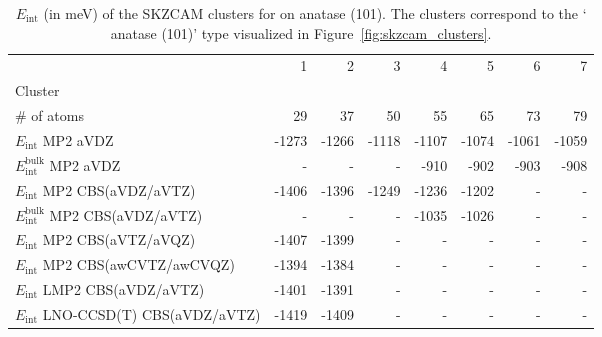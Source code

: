 \begin{table}
\caption{\label{tab:system_eint_a-tio2_h2o}$E_\textrm{int}$ (in meV) of the SKZCAM clusters for  on  anatase (101). The clusters correspond to the ` anatase (101)' type visualized in Figure~\ref{fig:skzcam_clusters}.}
\begin{adjustbox}{center,max width=1.4\textwidth}
\begin{tabular}{lrrrrrrr}
\toprule
 & 1 & 2 & 3 & 4 & 5 & 6 & 7 \\ 
Cluster &  &  &  &  &  &  &  \\
\midrule
\# of atoms & 29 & 37 & 50 & 55 & 65 & 73 & 79 \\
$E_\textrm{int}$ MP2 aVDZ & -1273 & -1266 & -1118 & -1107 & -1074 & -1061 & -1059 \\
$E_\textrm{int}^\textrm{bulk}$ MP2 aVDZ & - & - & - & -910 & -902 & -903 & -908 \\
$E_\textrm{int}$ MP2 CBS(aVDZ/aVTZ) & -1406 & -1396 & -1249 & -1236 & -1202 & - & - \\
$E_\textrm{int}^\textrm{bulk}$ MP2 CBS(aVDZ/aVTZ) & - & - & - & -1035 & -1026 & - & - \\
$E_\textrm{int}$ MP2 CBS(aVTZ/aVQZ) & -1407 & -1399 & - & - & - & - & - \\
$E_\textrm{int}$ MP2 CBS(awCVTZ/awCVQZ) & -1394 & -1384 & - & - & - & - & - \\
$E_\textrm{int}$ LMP2 CBS(aVDZ/aVTZ) & -1401 & -1391 & - & - & - & - & - \\
$E_\textrm{int}$ LNO-CCSD(T) CBS(aVDZ/aVTZ) & -1419 & -1409 & - & - & - & - & - \\
\bottomrule
\end{tabular}
\end{adjustbox}
\end{table}

